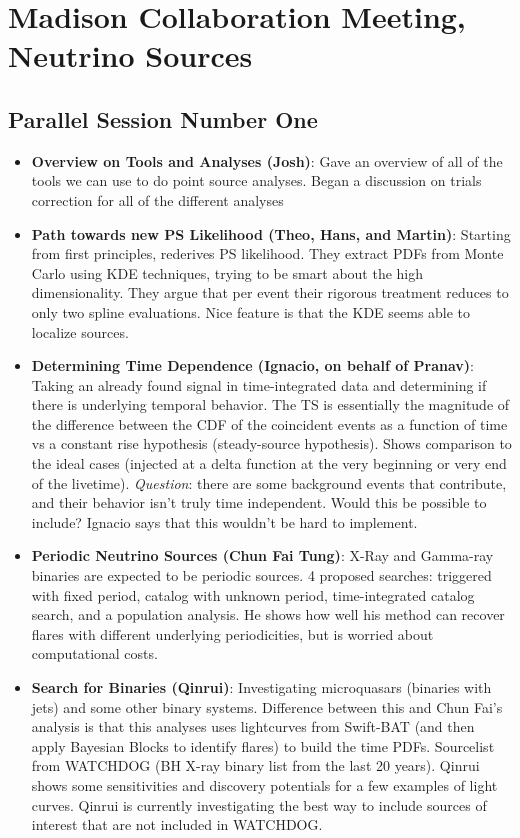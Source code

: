 \chapter{Madison Collaboration Meeting, Neutrino Sources}

\section{Parallel Session Number One}
\begin{itemize}
    \item \textbf{Overview on Tools and Analyses (Josh)}: Gave an overview of all of the tools we can use to do point source analyses. Began a discussion on trials correction for all of the different analyses
    \item \textbf{Path towards new PS Likelihood (Theo, Hans, and Martin)}: Starting from first principles, rederives PS likelihood. They extract PDFs from Monte Carlo using KDE techniques, trying to be smart about the high dimensionality. They argue that per event their rigorous treatment reduces to only two spline evaluations. Nice feature is that the KDE seems able to localize sources. 
    \item \textbf{Determining Time Dependence (Ignacio, on behalf of Pranav)}: Taking an already found signal in time-integrated data and determining if there is underlying temporal behavior. The TS is essentially the magnitude of the difference between the CDF of the coincident events as a function of time vs a constant rise hypothesis (steady-source hypothesis). Shows comparison to the ideal cases (injected at a delta function at the very beginning or very end of the livetime). \emph{Question}: there are some background events that contribute, and their behavior isn't truly time independent. Would this be possible to include? Ignacio says that this wouldn't be hard to implement.
    \item \textbf{Periodic Neutrino Sources (Chun Fai Tung)}: X-Ray and Gamma-ray binaries are expected to be periodic sources. 4 proposed searches: triggered with fixed period, catalog with unknown period, time-integrated catalog search, and a population analysis. He shows how well his method can recover flares with different underlying periodicities, but is worried about computational costs.
    \item \textbf{Search for Binaries (Qinrui)}: Investigating microquasars (binaries with jets) and some other binary systems. Difference between this and Chun Fai's analysis is that this analyses uses lightcurves from Swift-BAT (and then apply Bayesian Blocks to identify flares) to build the time PDFs. Sourcelist from WATCHDOG (BH X-ray binary list from the last 20 years). Qinrui shows some sensitivities and discovery potentials for a few examples of light curves. Qinrui is currently investigating the best way to include sources of interest that are not included in WATCHDOG.
\end{itemize}

